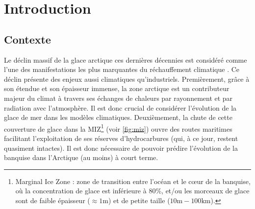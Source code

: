 
\chapter{Introduction} %

\label{Chapter1} %


\newcommand{\keyword}[1]{\textbf{#1}}
\newcommand{\tabhead}[1]{\textbf{#1}}
\newcommand{\code}[1]{\texttt{#1}}
\newcommand{\file}[1]{\texttt{\bfseries#1}}
\newcommand{\option}[1]{\texttt{\itshape#1}}









\section{Contexte}



Le déclin massif de la glace arctique ces dernières décennies est considéré comme l'une des manifestations les plus marquantes du réchauffement climatique \parencite{stroeve2012trends}. Ce déclin présente des enjeux aussi climatiques qu'industriels. Premièrement, grâce à son étendue et son épaisseur immense, la zone arctique est un contributeur majeur du climat à travers ses échanges de chaleurs par rayonnement et par radiation avec l'atmosphère. Il est donc crucial de considérer l'évolution de la glace de mer dans les modèles climatiques. Deuxièmement, la chute de cette couverture de glace dans la MIZ\footnote{Marginal Ice Zone : zone de transition entre l’océan et le c\oe{}ur de la banquise, où la concentration de glace est inférieure à $80$\%, et/ou les morceaux de glace sont de faible épaisseur ($\approx 1 \text{m}$) et de petite taille ($10 \text{m} - 100 \text{km}$).} (voir \cref{fig:miz}) ouvre des routes maritimes facilitant l'exploitation de ses réserves d’hydrocarbures (qui, à ce jour, restent quasiment intactes). Il est donc nécessaire de pouvoir prédire l'évolution de la banquise dans l'Arctique (au moins) à court terme.


